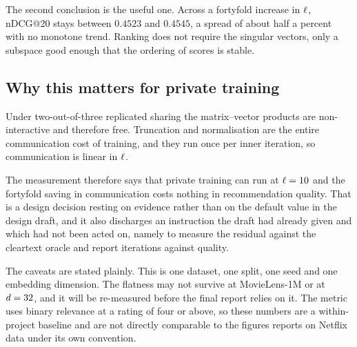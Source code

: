 The second conclusion is the useful one. Across a fortyfold increase in
$\ell$, nDCG@20 stays between $0.4523$ and $0.4545$, a spread of about half
a percent with no monotone trend. Ranking does not require the singular
vectors, only a subspace good enough that the ordering of scores is stable.

\subsection{Why this matters for private training}
\label{sec:tech:oracle:consequence}

Under two-out-of-three replicated sharing the matrix--vector products are
non-interactive and therefore free. Truncation and normalisation are the
entire communication cost of training, and they run once per inner iteration,
so communication is linear in $\ell$.

The measurement therefore says that private training can run at $\ell = 10$
and the fortyfold saving in communication costs nothing in recommendation
quality. That is a design decision resting on evidence rather than on the
default value in the design draft, and it also discharges an instruction the
draft had already given and which had not been acted on, namely to measure
the residual against the cleartext oracle and report iterations against
quality.

The caveats are stated plainly. This is one dataset, one split, one seed and
one embedding dimension. The flatness may not survive at MovieLens-1M or at
$d = 32$, and it will be re-measured before the final report relies on it.
The metric uses binary relevance at a rating of four or above, so these
numbers are a within-project baseline and are not directly comparable to the
figures \nudgeplain{} reports on Netflix data under its own convention.
